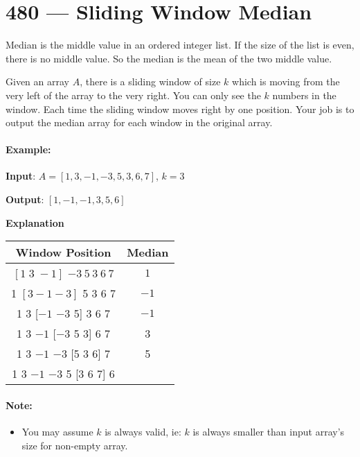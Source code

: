 \section{480 --- Sliding Window Median}
Median is the middle value in an ordered integer list. If the size of the list is even, there is no middle value. So the median is the mean of the two middle value.

Given an array $A$, there is a sliding window of size $k$ which is moving from the very left of the array to the very right. You can only see the $k$ numbers in the window. Each time the sliding window moves right by one position. Your job is to output the median array for each window in the original array.

\paragraph{Example:}

\begin{flushleft}
\textbf{Input}:  $A = [1,3,-1,-3,5,3,6,7]$, $k=3$

\textbf{Output}: $[1,-1,-1,3,5,6]$

\textbf{Explanation}

\begin{table}[H]
\begin{tabular}{cc}
Window Position & Median \\
\hline
$[1 \; 3 \; -1]$  $-3\   5\   3 \  6 \ 7$ & $1$ \\
1 $[3  -1  -3]$ 5  3  6  7 & $-1$ \\
1  3 [$-1$  $-3$  5] 3  6  7 &       $-1$ \\
1  3  $-1$ [$-3 $ 5  3] 6  7   &    3 \\
1  3  $-1$  $-3$ [5  3  6] 7   &    5 \\ 
1  3  $-1$  $-3$  5 [3  6  7]      6
\end{tabular}
\end{table}

\end{flushleft}

\paragraph{Note: }
\begin{itemize}
\item You may assume $k$ is always valid, ie: $k$ is always smaller than input array's size for non-empty array.
\end{itemize}


